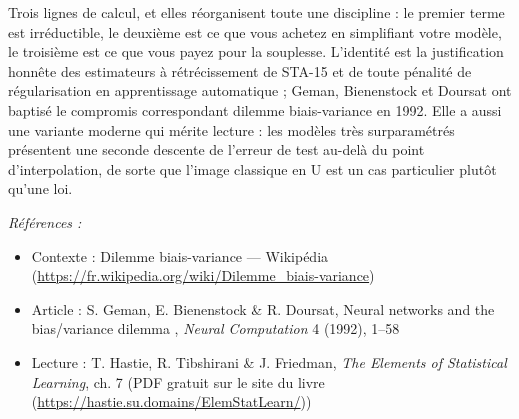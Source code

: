 \documentclass[11pt]{article}
\newenvironment{refs}{\par\small\noindent\emph{Références :}\begin{itemize}\setlength\itemsep{0pt}}{\end{itemize}\normalsize}
\begin{document}
\noindent Trois lignes de calcul, et elles réorganisent toute une discipline : le premier
terme est irréductible, le deuxième est ce que vous achetez en simplifiant votre modèle, le
troisième est ce que vous payez pour la souplesse. L'identité est la justification honnête des
estimateurs à rétrécissement de STA-15 et de toute pénalité de régularisation en apprentissage
automatique ; Geman, Bienenstock et Doursat ont baptisé le compromis correspondant \og{} dilemme
biais-variance \fg{} en 1992. Elle a aussi une variante moderne qui mérite lecture : les modèles très
surparamétrés présentent une seconde descente de l'erreur de test au-delà du point d'interpolation,
de sorte que l'image classique en U est un cas particulier plutôt qu'une loi.

\begin{refs}
\item Contexte : Dilemme biais-variance --- Wikipédia (\url{https://fr.wikipedia.org/wiki/Dilemme_biais-variance})
\item Article : S. Geman, E. Bienenstock \& R. Doursat, \og{} Neural networks and the bias/variance dilemma \fg{}, \textit{Neural Computation} 4 (1992), 1--58
\item Lecture : T. Hastie, R. Tibshirani \& J. Friedman, \textit{The Elements of Statistical Learning}, ch. 7 (PDF gratuit sur le site du livre (\url{https://hastie.su.domains/ElemStatLearn/}))
\end{refs}

\bigskip
\end{document}
